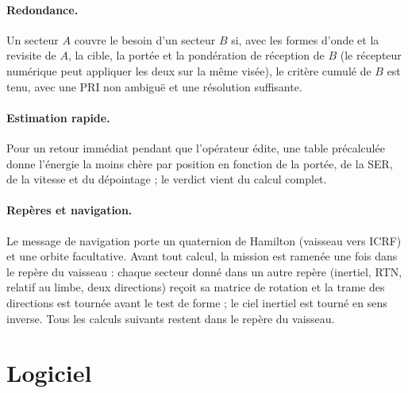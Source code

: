 \documentclass[11pt,a4paper]{article}
\begin{document}
\paragraph{Redondance.} Un secteur $A$ couvre le besoin d'un secteur $B$ si, avec les formes d'onde et la revisite de
$A$, la cible, la portée et la pondération de réception de $B$ (le récepteur numérique peut appliquer les deux sur la
même visée), le critère cumulé de $B$ est tenu, avec une PRI non ambiguë et une résolution suffisante.

\paragraph{Estimation rapide.} Pour un retour immédiat pendant que l'opérateur édite, une table précalculée donne
l'énergie la moins chère par position en fonction de la portée, de la SER, de la vitesse et du dépointage ; le verdict
vient du calcul complet.

\paragraph{Repères et navigation.}\label{sec:frames} Le message de navigation porte un quaternion de Hamilton (vaisseau
vers ICRF) et une orbite facultative. Avant tout calcul, la mission est ramenée une fois dans le repère du vaisseau :
chaque secteur donné dans un autre repère (inertiel, RTN, relatif au limbe, deux directions) reçoit sa matrice de
rotation et la trame des directions est tournée avant le test de forme ; le ciel inertiel est tourné en sens inverse.
Tous les calculs suivants restent dans le repère du vaisseau.

\section{Logiciel}\label{sec:software}
\end{document}
